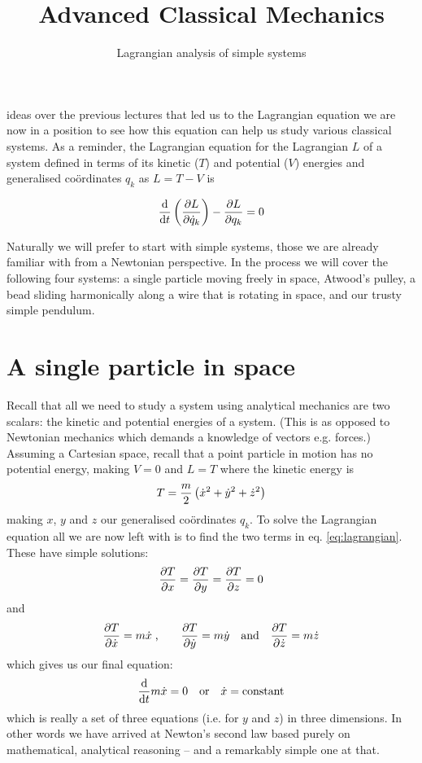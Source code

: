 \documentclass[english,seminar,headertitle]{lecture}
\title{Advanced Classical Mechanics}
\subtitle{Lagrangian analysis of simple systems}
\author{}
\date{}{}{}
\begin{document}
\noindent{} ideas over the previous lectures that led us to the Lagrangian equation we are now in a position to see how this equation can help us study various classical systems. As a reminder, the Lagrangian equation for the Lagrangian $L$ of a system defined in terms of its kinetic ($T$) and potential ($V$) energies and generalised co\"{o}rdinates $q_k$ as $L = T - V$ is

\begin{equation}
{\textrm{d} \over \textrm{d} t } \left( {\partial L \over \partial \dot{q}_k} \right) - {\partial L \over \partial q_k} = 0
\label{eq:lagrangian}
\end{equation}%

Naturally we will prefer to start with simple systems, those we are already familiar with from a Newtonian perspective. In the process we will cover the following four systems: a single particle moving freely in space, Atwood's pulley, a bead sliding harmonically along a wire that is rotating in space, and our trusty simple pendulum.

\section{A single particle in space}

Recall that all we need to study a system using analytical mechanics are two scalars: the kinetic and potential energies of a system. (This is as opposed to Newtonian mechanics which demands a knowledge of vectors e.g. forces.)  Assuming a Cartesian space, recall that a point particle in motion has no potential energy, making $V=0$ and $L=T$ where the kinetic energy is $$T = {m \over 2} \left( \dot{x}^2 + \dot{y}^2 + \dot{z}^2 \right)$$making $x$, $y$ and $z$ our generalised co\"{o}rdinates $q_k$. To solve the Lagrangian equation all we are now left with is to find the two terms in eq. \ref{eq:lagrangian}. These have simple solutions:
$${\partial T \over \partial x} = {\partial T \over \partial y} = {\partial T \over \partial z} = 0$$
and
$${\partial T \over \partial \dot{x}} = m\dot{x} \; \textrm{,} \qquad {\partial T \over \partial \dot{y}} = m\dot{y} \quad \textrm{and} \quad {\partial T \over \partial \dot{z}} = m\dot{z}$$
which gives us our final equation:
$$
	{\textrm{d} \over \textrm{d} t } m\dot{x} = 0 \quad \textrm{or} \quad \dot{x} = \textrm{constant}
$$
which is really a set of three equations (i.e. for $y$ and $z$) in three dimensions. In other words we have arrived at Newton's second law based purely on mathematical, analytical reasoning -- and a remarkably simple one at that.
\end{document}
